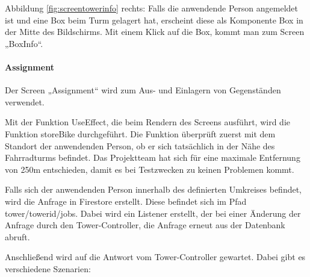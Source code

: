 \noindent Abbildung \ref{fig:screentowerinfo} rechts: Falls die anwendende Person angemeldet ist und eine Box beim Turm gelagert hat, erscheint diese als Komponente Box in der Mitte des Bildschirms. Mit einem Klick auf die Box, kommt man zum Screen „BoxInfo“.

\bigskip


\paragraph{Assignment}Der Screen „Assignment“ wird zum Aus- und Einlagern von Gegenständen verwendet.

\noindent Mit der Funktion UseEffect, die beim Rendern des Screens ausführt, wird die Funktion storeBike durchgeführt. Die Funktion überprüft zuerst mit dem Standort der anwendenden Person, ob er sich tatsächlich in der Nähe des Fahrradturms befindet. Das Projektteam hat sich für eine maximale Entfernung von 250m entschieden, damit es bei Testzwecken zu keinen Problemen kommt.

\noindent Falls sich der anwendenden Person innerhalb des definierten Umkreises befindet, wird die Anfrage in Firestore erstellt. Diese befindet sich im Pfad tower/towerid/jobs. Dabei wird ein Listener erstellt, der bei einer Änderung der Anfrage durch den Tower-Controller, die Anfrage erneut aus der Datenbank abruft.

\noindent Anschließend wird auf die Antwort vom Tower-Controller gewartet. Dabei gibt es verschiedene Szenarien:

